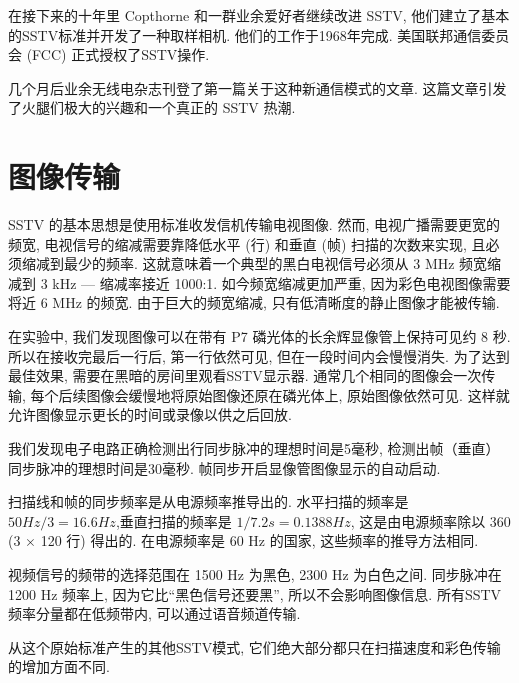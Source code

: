 在接下来的十年里 Copthorne 和一群业余爱好者继续改进 SSTV, 他们建立了基本的SSTV标准并开发了一种取样相机. 他们的工作于1968年完成. 美国联邦通信委员会 (FCC) 正式授权了SSTV操作. 

几个月后业余无线电杂志刊登了第一篇关于这种新通信模式的文章. 这篇文章引发了火腿们极大的兴趣和一个真正的 SSTV 热潮. 

\section{图像传输}

SSTV 的基本思想是使用标准收发信机传输电视图像. 然而, 电视广播需要更宽的频宽, 电视信号的缩减需要靠降低水平 (行) 和垂直 (帧) 扫描的次数来实现, 且必须缩减到最少的频率. 这就意味着一个典型的黑白电视信号必须从 3 MHz 频宽缩减到 3 kHz --- 缩减率接近 1000:1. 如今频宽缩减更加严重, 因为彩色电视图像需要将近 6 MHz 的频宽. 由于巨大的频宽缩减, 只有低清晰度的静止图像才能被传输. 

在实验中, 我们发现图像可以在带有 P7 磷光体的长余辉显像管上保持可见约 8 秒. 所以在接收完最后一行后, 第一行依然可见, 但在一段时间内会慢慢消失. 为了达到最佳效果, 需要在黑暗的房间里观看SSTV显示器. 通常几个相同的图像会一次传输, 每个后续图像会缓慢地将原始图像还原在磷光体上, 原始图像依然可见. 这样就允许图像显示更长的时间或录像以供之后回放. 

我们发现电子电路正确检测出行同步脉冲的理想时间是5毫秒, 检测出帧（垂直）同步脉冲的理想时间是30毫秒. 帧同步开启显像管图像显示的自动启动. 

扫描线和帧的同步频率是从电源频率推导出的. 水平扫描的频率是 $50 Hz / 3 = 16.6 Hz$,垂直扫描的频率是 $1/7.2 s=0.1388 Hz$, 这是由电源频率除以 360 (3 $\times$ 120 行) 得出的. 在电源频率是 60 Hz 的国家, 这些频率的推导方法相同. 

视频信号的频带的选择范围在 1500 Hz 为黑色, 2300 Hz 为白色之间. 同步脉冲在 1200 Hz 频率上, 因为它比“黑色信号还要黑”, 所以不会影响图像信息. 所有SSTV频率分量都在低频带内, 可以通过语音频道传输. 

从这个原始标准产生的其他SSTV模式, 它们绝大部分都只在扫描速度和彩色传输的增加方面不同. 
